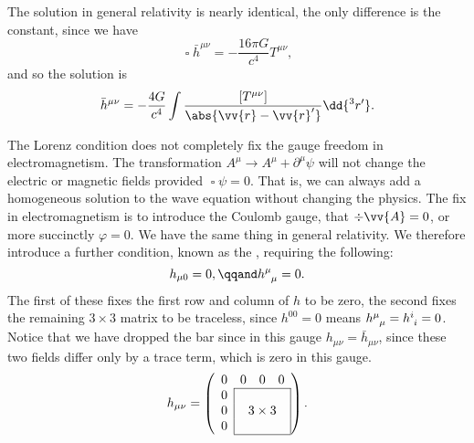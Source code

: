 \documentclass[fleqn]{NotesClass}
\newcommand*{\dalembertian}{\mathop{\square}}
\begin{document}
    The solution in general relativity is nearly identical, the only difference is the constant, since we have
    \begin{equation}
        \dalembertian \bar{h}^{\mu\nu} = -\frac{16 \pi G}{c^4}T^{\mu\nu},
    \end{equation}
    and so the solution is
    \begin{equation}
        \bar{h}^{\mu\nu} = -\frac{4G}{c^4} \int \frac{[T^{\mu\nu}]}{\abs{\vv{r} - \vv{r}'}} \dd{^3r'}.
    \end{equation}
    
    The Lorenz condition does not completely fix the gauge freedom in electromagnetism.
    The transformation \(A^\mu \to A^\mu + \partial^\mu\psi\) will not change the electric or magnetic fields provided \(\dalembertian\psi = 0\).
    That is, we can always add a homogeneous solution to the wave equation without changing the physics.
    The fix in electromagnetism is to introduce the Coulomb gauge, that \(\div\vv{A} = 0\), or more succinctly \(\varphi = 0\).
    We have the same thing in general relativity.
    We therefore introduce a further condition, known as the , requiring the following:
    \begin{equation}
        h_{\mu0} = 0, \qqand \tensor{h}{^\mu_\mu} = 0.
    \end{equation}
    The first of these fixes the first row and column of \(h\) to be zero, the second fixes the remaining \(3\times 3\) matrix to be traceless, since \(h^{00} = 0\) means \(\tensor{h}{^\mu_\mu} = \tensor{h}{^i_i} = 0\).
    Notice that we have dropped the bar since in this gauge \(h_{\mu\nu} = \bar{h}_{\mu\nu}\), since these two fields differ only by a trace term, which is zero in this gauge.
    \begin{equation}
        h_{\mu\nu} = 
        \left(
        \begin{array}{cccc}
            0 & 0 & 0 & 0\\\cline{2-4}
            0 & \multicolumn{1}{|c}{} && \multicolumn{1}{c|}{}\\
            0 & \multicolumn{1}{|c}{} & \mathclap{3\times 3} & \multicolumn{1}{c|}{}\\
            0 & \multicolumn{1}{|c}{} && \multicolumn{1}{c|}{}\\\cline{2-4}
        \end{array}
        \right).
    \end{equation}
    
\end{document}
